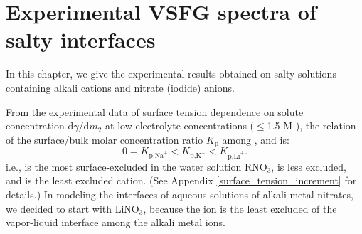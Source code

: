 \chapter{Experimental VSFG spectra of salty interfaces}\label{CHAPTER_SFG_Exp}
In this chapter, we give the experimental results obtained on salty solutions containing alkali cations and nitrate (iodide) anions. \cite{PS03,AJ12,HuaWei2014} 

From the experimental data of surface tension dependence on solute concentration $\text{d}\gamma/\text{d}m_2$ 
at low electrolyte concentrations ($\leq$1.5 M ), \cite{Weissenborn95,Hey81,Jarvis68,Jarvis72} 
the relation of the surface/bulk molar concentration ratio $K_{\text{p}}$ \cite{Pegram2006} among \li, \Na and \K is: 
\begin{equation}
0=K_{\text{p,Na}^+}< K_{\text{p,K}^+}< K_{\text{p,Li}^+}.
\label{eq:bscr}
\end{equation}
i.e., \Na is the most surface-excluded in the water solution RNO$_3$, \K is less excluded, 
and \Li is the least excluded cation. (See Appendix \ref{surface_tension_increment} for details.)
In modeling the interfaces of aqueous solutions of alkali metal nitrates, we decided to start with LiNO$_3$, because the \Li ion is the least excluded of the vapor-liquid interface 
among the alkali metal ions. 
%
%

